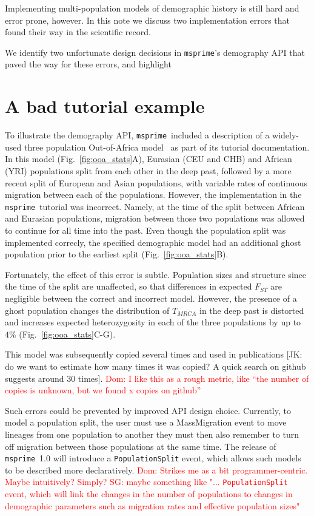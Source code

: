 \documentclass{article}
\newcommand{\msprime}[0]{\texttt{msprime}}
\newcommand{\dncomment}[1]{{\textcolor{red}{Dom: #1}}}
\newcommand{\sgcomment}[1]{{\textcolor{red}{SG: #1}}}
\begin{document}
Implementing multi-population models of demographic history is still hard and error
prone, however. In this note we discuss two implementation errors that found their way 
in the scientific record. 

We identify two unfortunate design decisions in \msprime's demography API 
that paved the way for these errors, and highlight  




\section{A bad tutorial example}

To illustrate the demography API, \msprime\ included a description of a widely-used
three population Out-of-Africa model~\citep{gutenkunst2009inferring} 
as part of its tutorial documentation. In this model (Fig.~\ref{fig:ooa_stats}A),
Eurasian (CEU and CHB) and African (YRI) populations split from each other in the deep past,
followed by a more recent split of European and Asian populations, with variable rates of
continuous migration between each of the populations. However, the implementation in the
\msprime\ tutorial was incorrect. Namely, at the time of the split between African and Eurasian
populations, migration between those two populations was allowed to continue for all time into the
past. Even though the population split was implemented correcly, the specified demographic model had 
an additional ghost population prior to the earliest split (Fig.~\ref{fig:ooa_stats}B).

Fortunately, the effect of this error is subtle. Population sizes and structure since the time of
the split are unaffected, so that differences in expected $F_{ST}$ are negligible between
the correct and incorrect model. However, the presence of a ghost population
changes the distribution of $T_{MRCA}$ in the deep past
is distorted and increases expected heterozygosity in each of the three
populations by up to $4\%$ (Fig.~\ref{fig:ooa_stats}C-G).

This model was subsequently copied
several times and used in publications [JK: do we want to estimate how
many times it was copied? A quick search on github suggests around 30
times]. \dncomment{I like this as a rough metric, like ``the number of copies
is unknown, but we found x copies on github''}

Such errors could be prevented by improved API design choice.
Currently, to model a population split, the user must use a MassMigration event to move
lineages from one population to another they must then also remember to turn off migration
between those populations at the same time.
The release of \msprime\ 1.0 will introduce a \texttt{PopulationSplit} event, which allows
such models to be described more declaratively.
\dncomment{Strikes me as a bit programmer-centric. Maybe intuitively? Simply?}
\sgcomment{maybe something like "... \texttt{PopulationSplit}  event, which will link the changes in 
the number of populations to changes in demographic parameters such as
migration rates and effective population sizes"  }
\end{document}
